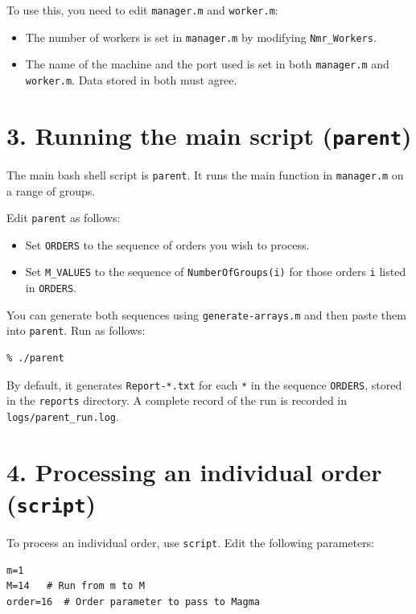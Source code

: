 \documentclass[a4paper,11pt]{article}
\begin{document}
To use this, you need to edit \texttt{manager.m} and \texttt{worker.m}:

\begin{itemize}[noitemsep]
    \item The number of workers is set in \texttt{manager.m} by modifying {\tt Nmr\_Workers}.
    \item The name of the machine and the port used is set in both \texttt{manager.m} and \texttt{worker.m}. Data stored in both must agree.
\end{itemize}

\section*{3. Running the main script (\texttt{parent})}

The main bash shell script is \texttt{parent}. It runs the main function in \texttt{manager.m} on a range of groups.

Edit \texttt{parent} as follows:

\begin{itemize}[noitemsep]
    \item Set \texttt{ORDERS} to the sequence of orders you wish to process.
    \item Set \texttt{M\_VALUES} to the sequence of \texttt{NumberOfGroups(i)} for those orders \texttt{i} listed in \texttt{ORDERS}.
\end{itemize}

You can generate both sequences using \texttt{generate-arrays.m} and then paste them into \texttt{parent}. Run as follows:

\begin{lstlisting}
% ./parent
\end{lstlisting}

By default, it generates \texttt{Report-*.txt} for each \texttt{*} in the sequence \texttt{ORDERS}, stored in the \texttt{reports} directory. A complete record of the run is recorded in \texttt{logs/parent\_run.log}.

\section*{4. Processing an individual order (\texttt{script})}

To process an individual order, use \texttt{script}. Edit the following parameters:

\begin{lstlisting}
m=1
M=14   # Run from m to M
order=16  # Order parameter to pass to Magma
\end{lstlisting}
\end{document}
